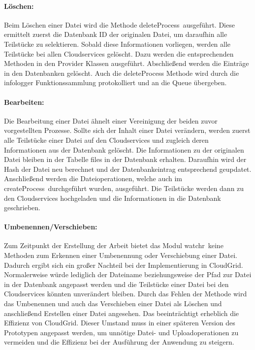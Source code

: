 \paragraph{Löschen:}Beim Löschen einer Datei wird die Methode \frqq deleteProcess\flqq\ ausgeführt.
Diese ermittelt zuerst die Datenbank ID der originalen Datei, um daraufhin alle Teilstücke zu selektieren.
Sobald diese Informationen vorliegen, werden alle Teilstücke bei allen Cloudservices gelöscht.
Dazu werden die entsprechenden Methoden in den Provider Klassen ausgeführt.
Abschließend werden die Einträge in den Datenbanken gelöscht.
Auch die deleteProcess Methode wird durch die infologger Funktionssammlung protokolliert und an die Queue übergeben.

\paragraph{Bearbeiten:}Die Bearbeitung einer Datei ähnelt einer Vereinigung der beiden zuvor vorgestellten Prozesse.
Sollte sich der Inhalt einer Datei verändern, werden zuerst alle Teilstücke einer Datei auf den Cloudservices und zugleich deren Informationen aus der Datenbank gelöscht.
Die Informationen zu der originalen Datei bleiben in der Tabelle files in der Datenbank erhalten.
Daraufhin wird der Hash der Datei neu berechnet und der Datenbankeintrag entsprechend geupdatet.
Anschließend werden die Dateioperationen, welche auch im \frqq createProcess\flqq\ durchgeführt wurden, ausgeführt.
Die Teilstücke werden dann zu den Cloudservices hochgeladen und die Informationen in die Datenbank geschrieben.

\paragraph{Umbenennen/Verschieben:}Zum Zeitpunkt der Erstellung der Arbeit bietet das Modul \frqq watchr\flqq\ keine Methoden zum Erkennen einer Umbenennung oder Verschiebung einer Datei.
Dadurch ergibt sich ein großer Nachteil bei der Implementierung in CloudGrid.
Normalerweise würde lediglich der Dateiname beziehungsweise der Pfad zur Datei in der Datenbank angepasst werden und die Teilstücke einer Datei bei den Cloudservices könnten unverändert bleiben.
Durch das Fehlen der Methode wird das Umbenennen und auch das Verschieben einer Datei als Löschen und anschließend Erstellen einer Datei angesehen.
Das beeinträchtigt erheblich die Effizienz von CloudGrid.
Dieser Umstand muss in einer späteren Version des Prototypen angepasst werden, um unnötige Datei- und Uploadoperationen zu vermeiden und die Effizienz bei der Ausführung der Anwendung zu steigern.

